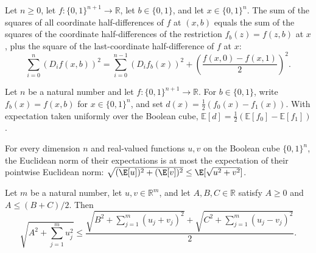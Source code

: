 \begin{lemma}
\leanok
{}
Let $n\ge 0$, let $f:\{0,1\}^{n+1}\to\mathbb R$, let $b\in\{0,1\}$, and let
$x\in\{0,1\}^n$. The sum of the squares of all coordinate half-differences of $f$ at
$(x,b)$ equals the sum of the squares of the coordinate half-differences of the
restriction $f_b(z)=f(z,b)$ at $x$, plus the square of the last-coordinate
half-difference of $f$ at $x$:
\[\sum_{i=0}^{n}(D_i f(x,b))^2=\sum_{i=0}^{n-1}(D_i f_b(x))^2+\left(\frac{f(x,0)-f(x,1)}{2}\right)^2.\]
\end{lemma}

\begin{lemma}
\leanok
{}
Let $n$ be a natural number and let $f\colon\{0,1\}^{n+1}\to\mathbb R$. For
$b\in\{0,1\}$, write $f_b(x)=f(x,b)$ for $x\in\{0,1\}^n$, and set
$d(x)=\tfrac12(f_0(x)-f_1(x))$. With expectation taken uniformly over the Boolean cube,
$\mathbb E[d]=\tfrac12(\mathbb E[f_0]-\mathbb E[f_1])$.
\end{lemma}

\begin{lemma}
\leanok
{}
For every dimension $n$ and real-valued functions $u,v$ on the Boolean cube
$\{0,1\}^n$, the Euclidean norm of their expectations is at most the expectation of
their pointwise Euclidean norm: $\sqrt{(\E[u])^2+(\E[v])^2}\le\E[\sqrt{u^2+v^2}]$.
\end{lemma}

\begin{lemma}
\leanok
{}
Let $m$ be a natural number, let $u,v\in\mathbb R^m$, and let $A,B,C\in\mathbb R$
satisfy $A\ge0$ and $A\le(B+C)/2$. Then
\[
\sqrt{A^2+\sum_{j=1}^m
u_j^2}\le\frac{\sqrt{B^2+\sum_{j=1}^m(u_j+v_j)^2}+\sqrt{C^2+\sum_{j=1}^m(u_j-v_j)^2}}{2}.
\]
\end{lemma}

